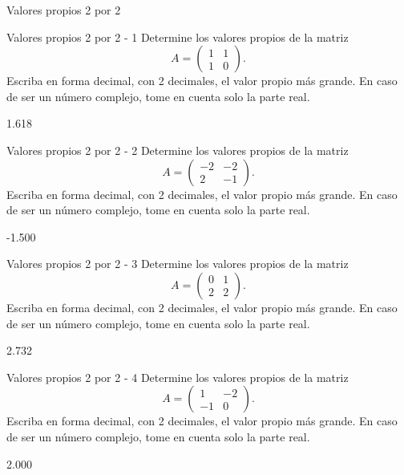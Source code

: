 \documentclass[a4,11pt]{aleph-notas}
\begin{document}
\begin{quiz}{Valores propios 2 por 2}

\begin{numerical}[tolerance=0.01]%
    {Valores propios 2 por 2 - 1}
    Determine los valores propios de la matriz
    \[
    A = \begin{pmatrix}
    1 & 1 \\
    1 & 0
    \end{pmatrix}.
    \]
    Escriba en forma decimal, con 2 decimales, el valor propio más grande. En caso de ser un número complejo, tome en cuenta solo la parte real.
    \item[] 1.618
\end{numerical}

\begin{numerical}[tolerance=0.01]%
    {Valores propios 2 por 2 - 2}
    Determine los valores propios de la matriz
    \[
    A = \begin{pmatrix}
    -2 & -2 \\
    2 & -1
    \end{pmatrix}.
    \]
    Escriba en forma decimal, con 2 decimales, el valor propio más grande. En caso de ser un número complejo, tome en cuenta solo la parte real.
    \item[] -1.500
\end{numerical}

\begin{numerical}[tolerance=0.01]%
    {Valores propios 2 por 2 - 3}
    Determine los valores propios de la matriz
    \[
    A = \begin{pmatrix}
    0 & 1 \\
    2 & 2
    \end{pmatrix}.
    \]
    Escriba en forma decimal, con 2 decimales, el valor propio más grande. En caso de ser un número complejo, tome en cuenta solo la parte real.
    \item[] 2.732
\end{numerical}

\begin{numerical}[tolerance=0.01]%
    {Valores propios 2 por 2 - 4}
    Determine los valores propios de la matriz
    \[
    A = \begin{pmatrix}
    1 & -2 \\
    -1 & 0
    \end{pmatrix}.
    \]
    Escriba en forma decimal, con 2 decimales, el valor propio más grande. En caso de ser un número complejo, tome en cuenta solo la parte real.
    \item[] 2.000
\end{numerical}


\end{quiz}
\end{document}
